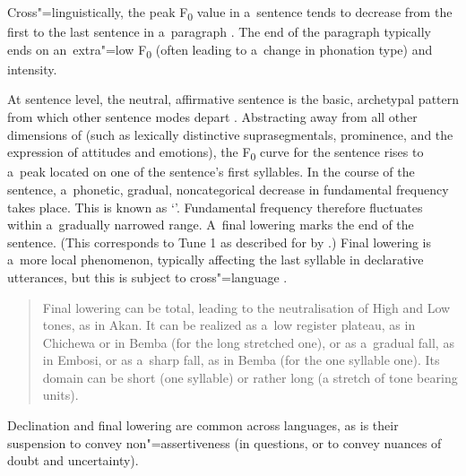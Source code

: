 Cross"=linguistically, the peak F\textsubscript{0} value in a~sentence tends to decrease from the
first to the last sentence in a~paragraph \citep{lehiste1975}. The end of the paragraph typically
ends on an~extra"=low F\textsubscript{0} (often leading to a~change in phonation
type) and intensity. 

At sentence level, the neutral, affirmative sentence is the basic,
archetypal pattern from which other sentence modes depart \citep{thorsen1980}. Abstracting away from all other dimensions of  (such as lexically distinctive suprasegmentals, prominence, and the expression of attitudes and emotions), the
F\textsubscript{0} curve for the sentence rises to a~peak located on one of the
sentence’s first syllables. In the course of the sentence,
a~phonetic, gradual, noncategorical decrease in fundamental frequency takes place. This is known as ‘’. Fundamental frequency therefore fluctuates within a~gradually narrowed
range. A~final lowering marks the end of the sentence. (This corresponds to Tune 1 as described for
 by \citealt{armstrongetal1926}.) Final lowering is a~more local phenomenon, typically
affecting the last syllable in declarative utterances, but this is subject to cross"=language .

\begin{quotation}
	Final lowering can be total, leading to the neutralisation of High and Low tones, as in Akan. It can be realized as a~low register plateau, as in Chi\-che\-wa or in Bemba (for the long stretched one), or as a~gradual fall, as in Embosi, or as a~sharp fall, as in Bemba (for the one syllable one). Its domain can be short (one syllable) or rather long (a stretch of tone bearing units). \citep[4-5]{downingrialland2016}
\end{quotation}

Declination and final lowering are common across languages, as is their suspension to convey
non"=assertiveness (in questions, or to convey nuances of doubt and uncertainty).


